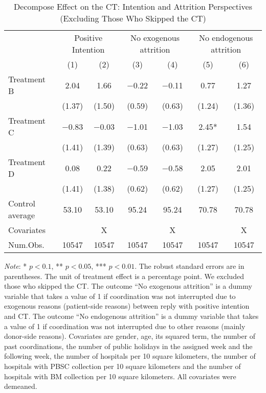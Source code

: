 \documentclass[12pt, a4paper]{article}
\begin{document}
\begin{table}[H]

\caption{\label{tab:lm-test-decompose-noskip}Decompose Effect on the CT: Intention and Attrition Perspectives (Excluding Those Who Skipped the CT)}
\centering
\fontsize{8}{10}\selectfont
\begin{threeparttable}
\begin{tabular}[t]{lcccccc}
\toprule
\multicolumn{1}{c}{ } & \multicolumn{2}{c}{Positive Intention} & \multicolumn{2}{c}{No exogenous attrition} & \multicolumn{2}{c}{No endogenous attrition} \\
\cmidrule(l{3pt}r{3pt}){2-3} \cmidrule(l{3pt}r{3pt}){4-5} \cmidrule(l{3pt}r{3pt}){6-7}
  & (1) & (2) & (3) & (4) & (5) & (6)\\
\midrule
Treatment B & \num{2.04} & \num{1.66} & \num{-0.22} & \num{-0.11} & \num{0.77} & \num{1.27}\\
 & (\num{1.37}) & (\num{1.50}) & (\num{0.59}) & (\num{0.63}) & (\num{1.24}) & (\num{1.36})\\
Treatment C & \num{-0.83} & \num{-0.03} & \num{-1.01} & \num{-1.03} & \num{2.45}* & \num{1.54}\\
 & (\num{1.41}) & (\num{1.39}) & (\num{0.63}) & (\num{0.63}) & (\num{1.27}) & (\num{1.25})\\
Treatment D & \num{0.08} & \num{0.22} & \num{-0.59} & \num{-0.58} & \num{2.05} & \num{2.01}\\
 & (\num{1.41}) & (\num{1.38}) & (\num{0.62}) & (\num{0.62}) & (\num{1.27}) & (\num{1.25})\\
\midrule
Control average & 53.10 & 53.10 & 95.24 & 95.24 & 70.78 & 70.78\\
Covariates &  & X &  & X &  & X\\
Num.Obs. & \num{10547} & \num{10547} & \num{10547} & \num{10547} & \num{10547} & \num{10547}\\
\bottomrule
\end{tabular}
\begin{tablenotes}
\item \emph{Note}: * $p < 0.1$, ** $p < 0.05$, *** $p < 0.01$. The robust standard errors are in parentheses. The unit of treatment effect is a percentage point. We excluded those who skipped the CT. The outcome ``No exogenous attrition'' is a dummy variable that takes a value of 1 if coordination was not interrupted due to exogenous reasons (patient-side reasons) between reply with positive intention and CT. The outcome ``No endogenous attrition'' is a dummy variable that takes a value of 1 if coordination was not interrupted due to other reasons (mainly donor-side reasons). Covariates are gender, age, its squared term, the number of past coordinations, the number of public holidays in the assigned week and the following week, the number of hospitals per 10 square kilometers, the number of hospitals with PBSC collection per 10 square kilometers and the number of hospitals with BM collection per 10 square kilometers. All covariates were demeaned.
\end{tablenotes}
\end{threeparttable}
\end{table}
\end{document}
